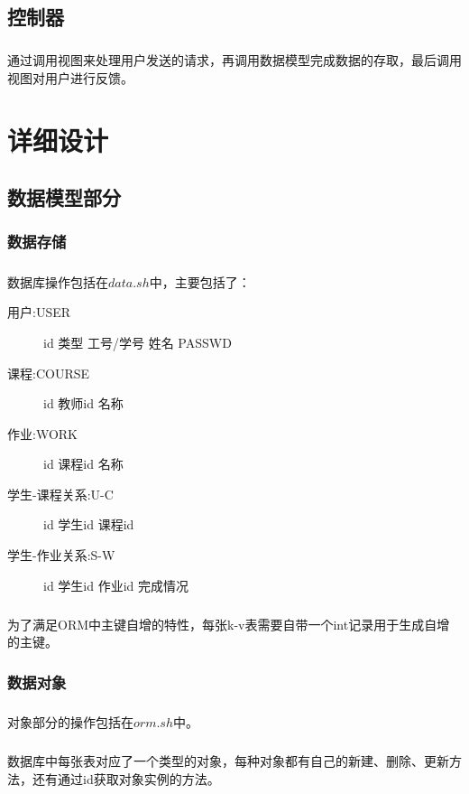 \documentclass[notitlepage,cs4size,punct,oneside]{report}
\begin{document}
\begin{CJK}{UTF8}{hei}
\section{控制器}
\paragraph{}
通过调用视图来处理用户发送的请求，再调用数据模型完成数据的存取，最后调用视图对用户进行反馈。

\chapter{详细设计}
\section{数据模型部分}
\subsection{数据存储}
\paragraph{}数据库操作包括在$data.sh$中，主要包括了：
\begin{description}
    \item [用户:USER] id 类型 工号/学号 姓名 PASSWD
    \item [课程:COURSE] id 教师id 名称
    \item [作业:WORK] id 课程id 名称
    \item [学生-课程关系:U-C] id 学生id 课程id 
    \item [学生-作业关系:S-W] id 学生id 作业id 完成情况
\end{description}
\paragraph{}为了满足ORM中主键自增的特性，每张k-v表需要自带一个int记录用于生成自增的主键。
\subsection{数据对象}
\paragraph{}对象部分的操作包括在$orm.sh$中。
\paragraph{}数据库中每张表对应了一个类型的对象，每种对象都有自己的新建、删除、更新方法，还有通过id获取对象实例的方法。

\end{CJK}
\end{document}

